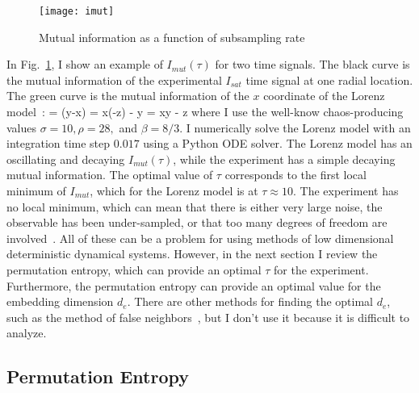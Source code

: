 \begin{figure}
\centerline{\texttt{[image: imut]}}
\caption{Mutual information as a function of subsampling rate}
\label{imut}
\end{figure}

In Fig.~\ref{imut}, I show an example of $I_{mut}(\tau)$ for two time signals. The black curve is the mutual information of the experimental $I_{sat}$ time signal at one radial location.
The green curve is the mutual information of the $x$ coordinate of the Lorenz model~\cite{lorenz1963}:
\beq
\label{lorenz_model}
 = \sigma(y-x)   \qquad {} =  x(\rho-z) - y  \qquad {} = xy - \beta z
\eeq
where I use the well-know chaos-producing values $\sigma=10, \rho=28,$ and $\beta = 8/3$. I numerically solve the Lorenz model with an integration time step $0.017$ using a Python ODE solver.
The Lorenz model has an oscillating and decaying $I_{mut}(\tau)$, while the experiment has a simple decaying mutual information. The optimal value of $\tau$ corresponds to the first local minimum
of $I_{mut}$, which for the Lorenz model is at $\tau \approx 10$. The experiment has no local minimum, which can mean that there is either very large noise, the observable has been under-sampled,
or that too many degrees of freedom are involved~\cite{manneville2004}. All of these can be a problem for using methods of low dimensional deterministic dynamical systems. However, in the next
section I review the permutation entropy, which can provide an optimal $\tau$ for the experiment. Furthermore, the permutation entropy can provide an optimal value for the embedding dimension
$d_e$. There are other methods for finding the optimal $d_e$, such as the method of false neighbors~\cite{manneville2004}, but I don't use it because it is difficult to analyze.

\subsection{Permutation Entropy}
\label{ss_pe}

